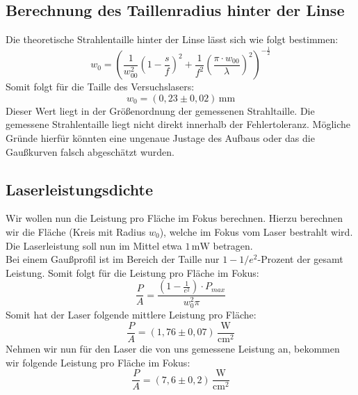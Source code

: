 \subsection{Berechnung des Taillenradius hinter der Linse}
Die theoretische Strahlentaille hinter der Linse lässt sich wie folgt bestimmen:
\begin{equation}
    w_0=\left(\frac{1}{w_{00}^2}\left(1-\frac{s}{f}\right)^2+\frac{1}{f^2}\left(\frac{\pi\cdot w_{00}}{\lambda}\right)^2\right)^{-\frac{1}{2}}
\end{equation}
Somit folgt für die Taille des Versuchslasers:
\begin{equation}
    w_0=\left(0,23\pm0,02\right)\,\text{mm}
\end{equation}
Dieser Wert liegt in der Größenordnung der gemessenen Strahltaille.
Die gemessene Strahlentaille liegt nicht direkt innerhalb der Fehlertoleranz. 
Mögliche Gründe hierfür könnten eine ungenaue Justage des Aufbaus oder das die Gaußkurven falsch abgeschätzt wurden.
\subsection{Laserleistungsdichte}
Wir wollen nun die Leistung pro Fläche im Fokus berechnen.
Hierzu berechnen wir die Fläche (Kreis mit Radius $w_0$), welche im Fokus vom Laser bestrahlt wird.
Die Laserleistung soll nun im Mittel etwa $1\,\text{mW}$ betragen.\\
Bei einem Gaußprofil ist im Bereich der Taille nur $1-1/e^2$-Prozent der gesamt Leistung.
Somit folgt für die Leistung pro Fläche im Fokus:
\begin{equation}
    \frac{P}{A}=\frac{(1-\frac{1}{e^2})\cdot P_{max}}{w_0^2\pi}
\end{equation}
Somit hat der Laser folgende mittlere Leistung pro Fläche:
\begin{equation}
    \frac{P}{A}=\left(1,76\pm0,07\right)\,\frac{\text{W}}{\text{cm}^2}
\end{equation}
Nehmen wir nun für den Laser die von uns gemessene Leistung an, bekommen wir folgende Leistung pro Fläche im Fokus:
\begin{equation}
    \frac{P}{A}=\left(7,6\pm0,2\right)\,\frac{\text{W}}{\text{cm}^2}
\end{equation}
